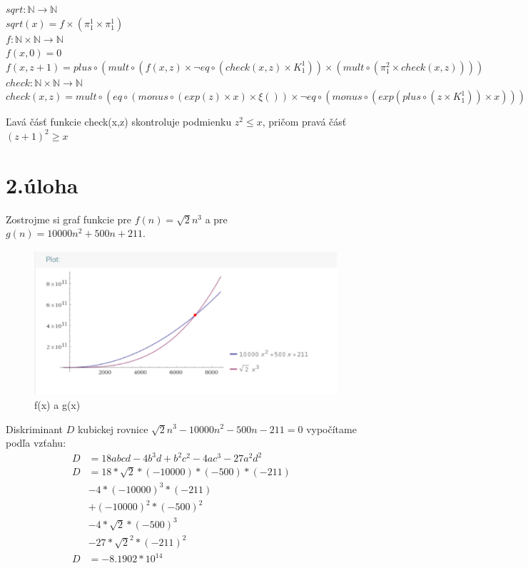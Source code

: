 \documentclass[11pt,a4paper]{article}
\begin{document}
  
$ sqrt : \mathbb N \rightarrow \mathbb N$ \\
$ sqrt(x) = f \times (\pi_1^1 \times \pi_1^1) $ \\

$ f : \mathbb N \times \mathbb N \rightarrow \mathbb N$ \\
$ f(x, 0) = 0 $ \\
$ f(x, z + 1) = plus \circ (mult \circ (f(x, z) \times \neg eq \circ (check(x, z) \times K_1^1)) \times (mult \circ(\pi_1^2 \times check(x, z)))) $ \\

$ check : \mathbb N \times \mathbb N \rightarrow \mathbb N$  \\
$ check(x, z) = mult \circ (eq \circ ( monus \circ (exp(z) \times x) \times \xi()) \times \neg eq \circ (monus \circ (exp(plus \circ (z \times K_1^1)) \times x))) $

Ľavá čásť funkcie check(x,z) skontroluje podmienku $ z^2 \leq x $, pričom pravá čásť $ (z + 1)^2 \geq x $

\newpage
\section{2.úloha}
Zostrojme si graf funkcie pre $ f(n) = \sqrt{2} n^3$ a pre $ g(n) = 10000n^2 + 500n + 211 $. \\

\begin{figure}[H]
    \centering
	\includegraphics[width=\textwidth]{2plot.eps}
    \caption{f(x) a g(x)}
    \label{2plot}
\end{figure}


Diskriminant $D$ kubickej rovnice $ \sqrt{2}n^3 -10000n^2 -500n -211 = 0$ vypočítame podľa vzťahu: 
\begin{align*}
    D & = 18abcd -4b^3d + b^2c^2 - 4ac^3 - 27a^2d^2 \\
    D & = 18*\sqrt{2}*(-10000)*(-500)*(-211) & \\
      & -4*(-10000)^3*(-211) & \\
      & +(-10000)^2*(-500)^2 & \\ 
      & -4*\sqrt{2}*(-500)^3 & \\
      & -27*\sqrt{2}^2*(-211)^2 \\
    D &= -8.1902*10^{14}
\end{align*}
\end{document}
